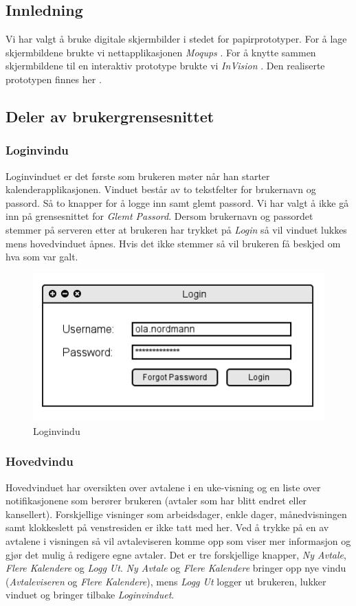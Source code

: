 \subsection{Innledning}
Vi har valgt å bruke digitale skjermbilder i stedet for papirprototyper. For å lage skjermbildene brukte vi nettapplikasjonen \emph{Moqups} \cite{moqups}. For å knytte sammen skjermbildene til en interaktiv prototype brukte vi \emph{InVision} \cite{invision}. Den realiserte prototypen finnes her \cite{invisio}. 

\subsection{Deler av brukergrensesnittet}
\subsubsection{Loginvindu}
Loginvinduet er det første som brukeren møter når han starter kalenderapplikasjonen. Vinduet består av to tekstfelter for brukernavn og passord. Så to knapper for å logge inn samt glemt passord. Vi har valgt å ikke gå inn på grensesnittet for \emph{Glemt Passord}. Dersom brukernavn og passordet stemmer på serveren etter at brukeren har trykket på \emph{Login} så vil vinduet lukkes mens hovedvinduet åpnes. Hvis det ikke stemmer så vil brukeren få beskjed om hva som var galt.

\begin{figure}[H]
\centering
\includegraphics[scale=0.65]{images/login.png}
\caption{Loginvindu}
\label{login_image}
\end{figure}

\subsubsection{Hovedvindu}
Hovedvinduet har oversikten over avtalene i en uke-visning og en liste over notifikasjonene som berører brukeren (avtaler som har blitt endret eller kansellert). Forskjellige visninger som arbeidsdager, enkle dager, månedvisningen samt klokkeslett på venstresiden er ikke tatt med her. Ved å trykke på en av avtalene i visningen så vil avtaleviseren komme opp som viser mer informasjon og gjør det mulig å redigere egne avtaler. Det er tre forskjellige knapper, \emph{Ny Avtale}, \emph{Flere Kalendere} og \emph{Logg Ut}. \emph{Ny Avtale} og \emph{Flere Kalendere} bringer opp nye vindu (\emph{Avtaleviseren} og \emph{Flere Kalendere}), mens \emph{Logg Ut} logger ut brukeren, lukker vinduet og bringer tilbake \emph{Loginvinduet}.

